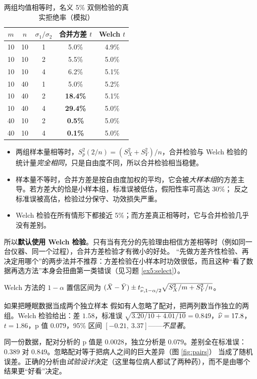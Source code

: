 \begin{table}[H]
\centering\small
\caption{两组均值相等时，名义 5\% 双侧检验的真实拒绝率（模拟）}\label{tab:welchsim}
\begin{tabular}{cc c cc}
\toprule
$m$ & $n$ & $\sigma_1/\sigma_2$ & 合并方差 $t$ & Welch $t$\\
\midrule
10 & 10 & 1 & 5.0\% & 4.9\% \\
10 & 10 & 2 & 5.5\% & 5.0\% \\
10 & 10 & 4 & 6.2\% & 5.1\% \\
\midrule
10 & 40 & 1 & 5.0\% & 5.2\% \\
10 & 40 & 2 & \textcolor{accent}{\textbf{18.4\%}} & 5.1\% \\
10 & 40 & 4 & \textcolor{accent}{\textbf{29.4\%}} & 5.0\% \\
\midrule
40 & 10 & 2 & \textcolor{main}{\textbf{0.5\%}} & 5.0\% \\
40 & 10 & 4 & \textcolor{main}{\textbf{0.1\%}} & 5.0\% \\
\bottomrule
\end{tabular}
\end{table}

\begin{intuition}[读懂这张表]
\begin{itemize}
\item 两组样本量相等时，$S_p^2(2/n)=(S_X^2+S_Y^2)/n$，合并检验与 Welch 检验的统计量\emph{完全相同}，只是自由度不同，所以合并检验相当稳健。
\item 样本量不等时，合并方差是按自由度加权的平均，它会被\emph{大样本组}的方差主导。若方差大的恰是小样本组，标准误被低估，假阳性率可高达 $30\%$；
反之标准误被高估，检验过分保守、功效损失严重。
\item Welch 检验在所有情形下都接近 5\%；而方差真正相等时，它与合并检验几乎没有差别。
\end{itemize}
所以\textbf{默认使用 Welch 检验}。只有当有充分的先验理由相信方差相等时（例如同一台仪器、同一个过程），合并方差检验才有微小的好处。
“先做方差齐性检验、再决定用哪个”的两步法并不推荐：方差检验在小样本时功效很低，而且这种“看了数据再选方法”本身会扭曲第一类错误（见习题 \ref{ex5:select}）。
\end{intuition}

Welch 方法的 $1-\alpha$ 置信区间为 $(\bar{X}-\bar{Y})\pm t_{\widehat{\nu},1-\alpha/2}\sqrt{S_X^2/m+S_Y^2/n}$。

\begin{casestudy}{如果把睡眠数据当成两个独立样本}
假如有人忽略了配对，把两列数当作独立的两组。Welch 检验给出：差 $1.58$，标准误 $\sqrt{3.20/10+4.01/10}=0.849$，$\widehat{\nu}=17.8$，
$t=1.86$，p 值 $0.079$，95\% 区间 $[-0.21,\ 3.37]$——\emph{不显著}。

同一份数据，配对分析的 p 值是 $0.0028$，独立分析是 $0.079$。差别全在标准误：$0.389$ 对 $0.849$。忽略配对等于把病人之间的巨大差异（图 \ref{fig:pairs}）
当成了随机误差。正确的分析由\emph{试验设计}决定（这里每位病人都试了两种药），而不是由哪个结果更“好看”决定。
\end{casestudy}

